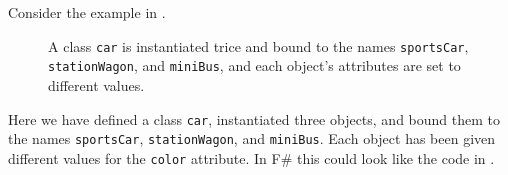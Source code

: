 Consider the example in .
\begin{figure}
  \centering
  \caption{A class \lstinline{car} is instantiated trice and bound to the names \lstinline{sportsCar}, \lstinline{stationWagon}, and \lstinline{miniBus}, and each object's attributes are set to different values.}
  \label{fig:instantiation}
\end{figure}
Here we have defined a class \lstinline{car}, instantiated three objects, and bound them to the names \lstinline{sportsCar}, \lstinline{stationWagon}, and \lstinline{miniBus}. Each object has been given different values for the \lstinline{color} attribute. In F\# this could look like the code in .
%
%
%
